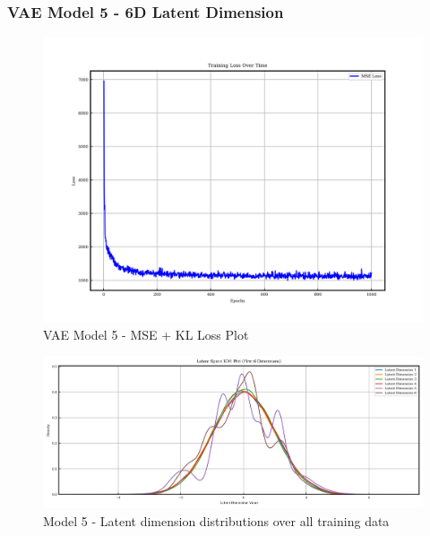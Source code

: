\documentclass{article}
\begin{document}
\subsubsection{VAE Model 5 - 6D Latent Dimension}

\begin{figure}[H]
\centering
    \includegraphics[width=0.75\linewidth]{figures/VAEmodels/model5/loss_plot.png}
    \caption{VAE Model 5 - MSE + KL Loss Plot}
    \label{fig:model5_loss_plot}
\end{figure}

\begin{figure}[H]
    \centering
    \includegraphics[width=0.75\linewidth]{figures/VAEmodels/model5/latent_distribution.png}
    \caption{Model 5 - Latent dimension distributions over all training data}
    \label{fig:model5_latent_dist}
\end{figure}
\end{document}
